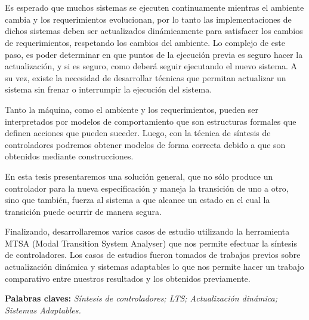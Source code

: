 \chapter*{\runtitulo}

\noindent Es esperado que muchos sistemas se ejecuten continuamente mientras el ambiente cambia y los requerimientos
evolucionan, por lo tanto las implementaciones de dichos sistemas deben ser actualizados dinámicamente para satisfacer
los cambios de requerimientos, respetando los cambios del ambiente. Lo complejo de este paso, es poder determinar en que
puntos de la ejecución previa es seguro hacer la actualización, y si es seguro, como deberá seguir ejecutando el nuevo
sistema. A su vez, existe la necesidad de desarrollar técnicas que permitan actualizar un sistema sin frenar o
interrumpir la ejecución del sistema.

\noindent Tanto la máquina, como el ambiente y los requerimientos, pueden ser interpretados por modelos de
comportamiento que son estructuras formales que definen acciones que pueden suceder. Luego, con la técnica de síntesis de
controladores podremos obtener modelos de forma correcta debido a que son obtenidos mediante construcciones.

\noindent En esta tesis presentaremos una solución general, que no sólo produce un controlador para la nueva
especificación y maneja la transición de uno a otro, sino que también, fuerza al sistema a que alcance un estado en el
cual la transición puede ocurrir de manera segura.

\noindent Finalizando, desarrollaremos varios casos de estudio utilizando la herramienta MTSA (Modal Transition System
Analyser) que nos permite efectuar la síntesis de controladores. Los casos de estudios fueron tomados de trabajos
previos sobre actualización dinámica y sistemas adaptables lo que nos permite hacer un trabajo comparativo entre
nuestros resultados y los obtenidos previamente.

 
\bigskip

\noindent\textbf{Palabras claves:} \textit{Síntesis de controladores; LTS; Actualización dinámica; Sistemas Adaptables.}
